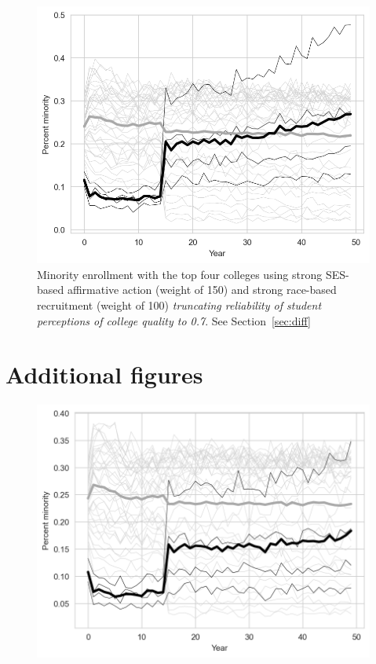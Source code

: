 \begin{appendices}
\begin{figure}[ht!]
  \centering
  \includegraphics[width=.79\textwidth]{figures/figC4_pq07.png}
  \caption{Minority enrollment with the top four colleges using strong SES-based affirmative action (weight of 150) and strong race-based recruitment (weight of 100) \emph{truncating reliability of student perceptions of college quality to 0.7}. See Section~\ref{sec:diff}}
  \label{fig:c4_pq07}
\end{figure}

\section{Additional figures}\label{sec:add}

\begin{figure}[p]
  \centering
  \includegraphics[width=.79\textwidth]{figures/figC3.png}
  \caption{}
  \label{fig:c3}
\end{figure}


\end{appendices}
